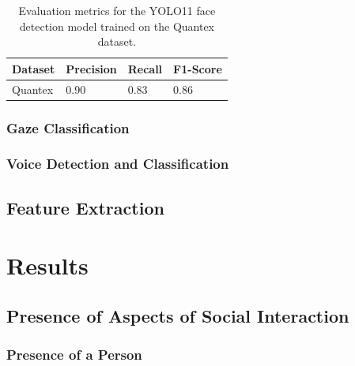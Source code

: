 \documentclass[
  man,floatsintext]{apa6}
\begin{document}
\begin{table}[tbp]

\begin{center}
\begin{threeparttable}

\caption{\label{tab:face-detection-metrics}Evaluation metrics for the YOLO11 face detection model trained on the Quantex dataset.}

\begin{tabular}{llll}
\toprule
Dataset & \multicolumn{1}{c}{Precision} & \multicolumn{1}{c}{Recall} & \multicolumn{1}{c}{F1-Score}\\
\midrule
Quantex & 0.90 & 0.83 & 0.86\\
\bottomrule
\end{tabular}

\end{threeparttable}
\end{center}

\end{table}

\subsubsection{Gaze Classification}\label{gaze-classification}

\subsubsection{Voice Detection and Classification}\label{voice-detection-and-classification}

\subsection{Feature Extraction}\label{feature-extraction}

\section{Results}\label{results}

\subsection{Presence of Aspects of Social Interaction}\label{presence-of-aspects-of-social-interaction}

\subsubsection{Presence of a Person}\label{presence-of-a-person}
\end{document}
